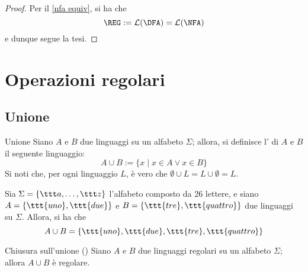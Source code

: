 \documentclass[a4paper, 12pt]{report}
\begin{document}
    \begin{proof}
        Per il \cref{nfa equiv}, si ha che $$\mathrm{\REG} := \mathcal{L}(\mathrm{\DFA}) = \mathcal{L}(\mathrm{\NFA})$$ e dunque segue la tesi.
    \end{proof}

    \section{Operazioni regolari}

    \subsection{Unione}
    
    \begin{frameddefn}{Unione}
        Siano $A$ e $B$ due linguaggi su un alfabeto $\Sigma$; allora, si definisce l' di $A$ e $B$ il seguente linguaggio: $$A \cup B := \{x \mid x \in A \lor x \in B \}$$ Si noti che, per ogni linguaggio $L$, è vero che $\emptyset \cup L = L \cup \emptyset = L$.
    \end{frameddefn}

    \begin{example}[Unione]
        Sia $\Sigma = \{\ttt a , \ldots, \ttt z\}$ l'alfabeto composto da 26 lettere, e siano $A = \{\ttt{uno}, \ttt{due}\}$ e $B = \{\ttt{tre}, \ttt{quattro}\}$ due linguaggi su $\Sigma$. Allora, si ha che $$A \cup B = \{\ttt{uno}, \ttt{due}, \ttt{tre}, \ttt{quattro}\}$$
    \end{example}

    \begin{framedprop}[label={closure unione}]{Chiusura sull'unione (\REG)}
        Siano $A$ e $B$ due linguaggi regolari su un alfabeto $\Sigma$; allora $A \cup B$ è regolare.
    \end{framedprop}
\end{document}

